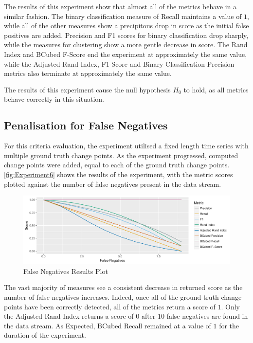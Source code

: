 \documentclass{uvamscse}	%
\begin{document}
The results of this experiment show that almost all of the metrics behave in a similar fashion. The binary classification measure of Recall maintains a value of $1$, while all of the other measures show a precipitous drop in score as the initial false positives are added. Precision and F1 scores for binary classification drop sharply, while the measures for clustering show a more gentle decrease in score. The Rand Index and BCubed F-Score end the experiment at approximately the same value, while the Adjusted Rand Index, F1 Score and Binary Classification Precision metrics also terminate at approximately the same value.

The results of this experiment cause the null hypothesis $H_0$ to hold, as all metrics behave correctly in this situation.

\subsection{Penalisation for False Negatives}

For this criteria evaluation, the experiment utilised a fixed length time series with multiple ground truth change points. As the experiment progressed, computed change points were added, equal to each of the ground truth change points. \autoref{fig:Experiment6} shows the results of the experiment, with the metric scores plotted against the number of false negatives present in the data stream.

\begin{figure}[h]
    \includegraphics[width=\textwidth]{figures/Experiment6}
    \caption{False Negatives Results Plot}
    \label{fig:Experiment6}
\end{figure}

The vast majority of measures see a consistent decrease in returned score as the number of false negatives increases. Indeed, once all of the ground truth change points have been correctly detected, all of the metrics return a score of $1$. Only the Adjusted Rand Index returns a score of $0$ after $10$ false negatives are found in the data stream. As Expected, BCubed Recall remained at a value of $1$ for the duration of the experiment.
\end{document}
